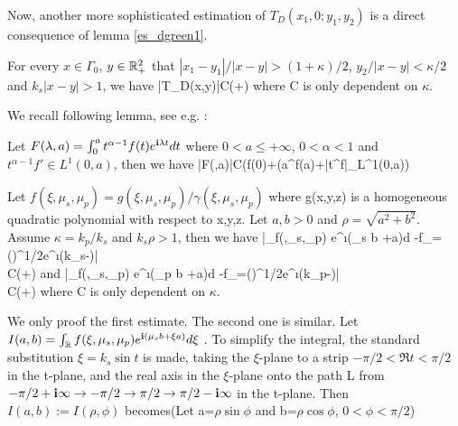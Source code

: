 \documentclass[12pt]{iopart}
\begin{document}
\finproof
Now, another more sophisticated estimation of $T_D(x_1,0;y_1,y_2)$ is a direct consequence of lemma \ref{es_dgreen1}.
\begin{lem}\label{es_dgreen2}
	For every $x\in\Gamma_0$, $y\in{\mathbb{R}}_+^2$ that $|x_1-y_1|/|x-y|>(1+\kappa)/2$, $y_2/|x-y|<\kappa/2$ and $k_s |x-y|>1$, we have
	\be
	|T_D(x,y)|\leq C(+)
	\ee
	where C is only dependent on $\kappa$.
\end{lem}
We recall following lemma, see e.g. \cite{Wong_Asymptotic}:
\begin{lem} \label{asym_frac}
	Let $F(\lambda,a)=\int_{0}^{a} t^{\alpha-1}f(t)e^{\mathbf{i}\lambda t}dt$ where $0<a\leq+\infty$, $0<\alpha<1$ and $t^{\alpha-1}f'\in L^1(0,a)$, then we have
	\be
	|F(\lambda,a)|\leq C(f(0)+(a^{}f(a)+|t^{}f|_{L^1(0,a)})
	\ee
\end{lem}
\begin{lem}\label{pr_dgreen}
	Let $f(\xi,\mu_s,\mu_p)=g(\xi,\mu_s,\mu_p)/\gamma(\xi,\mu_s,\mu_p)$ where g(x,y,z) is a homogeneous quadratic polynomial with respect to x,y,z. Let $a,b>0$ and $\rho=\sqrt{a^2+b^2}$. Assume $\kappa=k_p/k_s$ and $k_s\rho >1$, then we have
	\be \label{pr_dgreen1} \nn
	\Big|\int_\R f(\xi,\mu_s,\mu_p) e^{\i(\mu_s b +\xi a)}d\xi
	-f_{\xi=}()^{1/2}e^{\i(k_s\rho-)}\Big|
	\\ \hspace{-0.5cm}
	 \leq C(+)
	\ee
	and
		\be \label{pr_dgreen2} \nn
	\Big|\int_\R f(\xi,\mu_s,\mu_p) e^{\i(\mu_p b +\xi a)}d\xi
	-f_{\xi=}()^{1/2}e^{\i(k_p\rho-)}\Big|
	\\ \hspace{-0.5cm}
	\leq C(+)
	\ee
	where C is only dependent on $\kappa$.
\end{lem}
\debproof
We only proof the first estimate. The second one is similar.
Let $I(a,b)=\int_{\mathbb{R}} f(\xi,\mu_s,\mu_p) e^{\mathbf{i}(\mu_s b +\xi a)}d\xi$ . To simplify the integral, the standard substitution $\xi=k_s\sin t$ is made, taking the $\xi$-plane to a strip $-\pi/2<\Re t <\pi/2$ in the t-plane, and the real axis in the $\xi$-plane onto the path L from $-\pi/2+\mathbf{i}\infty\rightarrow-\pi/2\rightarrow\pi/2\rightarrow\pi/2-\mathbf{i}\infty$ in the t-plane. Then $I(a,b):=I(\rho,\phi)$ becomes(Let a=$\rho \sin\phi$  and b=$\rho\cos\phi$, $0<\phi<\pi/2$)
\end{document}
